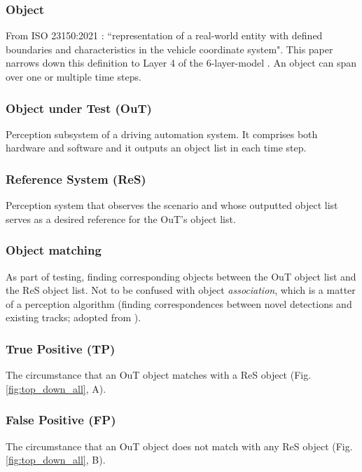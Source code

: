 \documentclass[conference]{IEEEtran}
\begin{document}
\subsubsection{Object} \label{def:object}
From ISO 23150:2021 \cite{ISO_23150_2021_data_communication}: 
``representation of a real-world entity with defined boundaries and characteristics in the vehicle coordinate system".
This paper narrows down this definition to Layer 4 of the 6-layer-model \cite{Scholtes20216lmAccess}. An object can span over one or multiple time steps. 

\subsubsection{Object under Test (OuT)} \label{def:out} Perception subsystem of a driving automation system. It comprises both hardware and software and it outputs an object list in each time step. 

\subsubsection{Reference System (ReS)}
\label{def:reference_system}
Perception system that observes the scenario and whose outputted object list serves as a desired reference for the OuT's object list. 

\subsubsection{Object matching} \label{def:association} 
As part of testing, finding corresponding objects between the OuT object list and the ReS object list.
Not to be confused with object \textit{association}, which is a matter of a perception algorithm (finding correspondences between novel detections and existing tracks; adopted from \cite{Luiten2020hota}).

\subsubsection{True Positive (TP)} \label{def:tp} The circumstance that an OuT object matches with a ReS object (Fig. \ref{fig:top_down_all}, A).

\subsubsection{False Positive (FP)} \label{def:fp} The circumstance that an OuT object does not match with any ReS object (Fig. \ref{fig:top_down_all}, B). 
\end{document}

